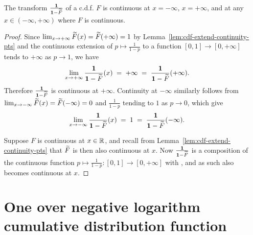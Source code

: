 \begin{lemma}
  \label{lem:one-div-one-sub-cdf-continuity-pts}
  \leanok
  The transform $\frac{\mathbf{1}}{\mathbf{1}-\widetilde{F}}$ of a c.d.f. $F$ is continuous
  at $x = -\infty$, $x = + \infty$, and at any
  $x \in (-\infty,+\infty)$ where $F$ is continuous.
\end{lemma}
\begin{proof}
  Since $\lim_{x \to +\infty} \widetilde{F}(x) = \widetilde{F}(+\infty) = 1$
  by Lemma~\ref{lem:cdf-extend-continuity-pts} and the continuous extension
  of $p \mapsto \frac{1}{1-p}$ to a function $[0,1] \to [0,+\infty]$
  tends to $+\infty$ as $p \to 1$, we have
  \begin{align*}
    \lim_{x \to +\infty} \frac{\mathbf{1}}{\mathbf{1}-\widetilde{F}}(x)
    \; = \; +\infty \; = \; \frac{\mathbf{1}}{\mathbf{1}-\widetilde{F}}(+\infty) .
  \end{align*}
  Therefore $\frac{\mathbf{1}}{\mathbf{1}-\widetilde{F}}$ is continuous at $+\infty$.
  Continuity at $-\infty$ similarly follows from
  $\lim_{x \to -\infty} \widetilde{F}(x) = \widetilde{F}(-\infty) = 0$
  and $\frac{1}{1-p}$ tending to $1$
  as $p \to 0$, which give
  \begin{align*}
    \lim_{x \to -\infty} \frac{\mathbf{1}}{\mathbf{1}-\widetilde{F}}(x)
    \; = \; 1 \; = \; \frac{\mathbf{1}}{\mathbf{1}-\widetilde{F}}(-\infty) .
  \end{align*}

  Suppose $F$ is continuous at $x \in \mathbb{R}$,
  and recall from Lemma~\ref{lem:cdf-extend-continuity-pts} that
  $\widetilde{F}$ is then also continuous at $x$.
  Now $\frac{\mathbf{1}}{\mathbf{1}-\widetilde{F}}$ is a composition of the continuous function
  $p \mapsto \frac{1}{1-p} \colon [0,1] \to [0,+\infty]$ with
  , and as such also becomes continuous at $x$.
\end{proof}

\section{One over negative logarithm cumulative distribution function}

